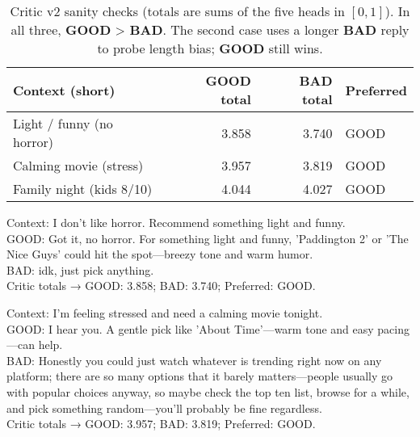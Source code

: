 \documentclass[12pt]{article}
\begin{document}
  \begin{table}[h]
  \centering
  \begin{tabular}{p{5.3cm}rrl}
  \toprule
  Context (short) & GOOD total & BAD total & Preferred \\
  \midrule
  Light / funny (no horror) & 3.858 & 3.740 & GOOD \\
  Calming movie (stress)    & 3.957 & 3.819 & GOOD \\
  Family night (kids 8/10)  & 4.044 & 4.027 & GOOD \\
  \bottomrule
  \end{tabular}
  \caption{Critic v2 sanity checks (totals are sums of the five heads in \([0,1]\)). In all three, \textbf{GOOD} > \textbf{BAD}. The second case uses a longer \textbf{BAD} reply to probe length bias; \textbf{GOOD} still wins.}
  \label{tab:critic_sanity}
  \end{table}

  \begin{center}
  \begin{qexample}
  Context: I don't like horror. Recommend something light and funny.\\
  GOOD: Got it, no horror. For something light and funny, 'Paddington 2' or 'The Nice Guys' could hit the spot—breezy tone and warm humor.\\
  BAD: idk, just pick anything.\\
  Critic totals → GOOD: 3.858; BAD: 3.740; Preferred: GOOD.
  \end{qexample}
  \end{center}

  \begin{center}
  \begin{qexample}
  Context: I'm feeling stressed and need a calming movie tonight.\\
  GOOD: I hear you. A gentle pick like 'About Time'—warm tone and easy pacing—can help.\\
  BAD: Honestly you could just watch whatever is trending right now on any platform; there are so many options that it barely matters—people usually go with popular choices anyway, so maybe check the top ten list, browse for a while, and pick something random—you'll probably be fine regardless.\\
  Critic totals → GOOD: 3.957; BAD: 3.819; Preferred: GOOD.
  \end{qexample}
  \end{center}
\end{document}
